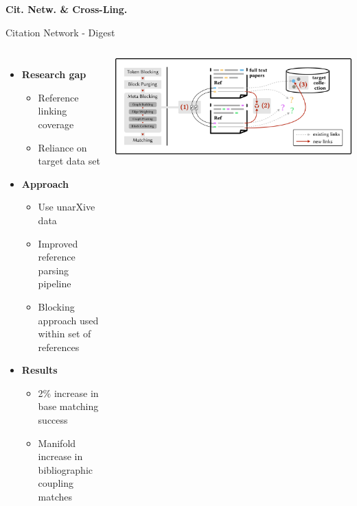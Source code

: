 \documentclass[en,16:9,smallfoot]{sdqbeamer}
\begin{document}
   \begin{frame}[plain]
        \vspace{0.7cm}
        \begin{infobox-map}
        \centering
        \begin{Huge}
        \textbf{Cit. Netw. \& Cross-Ling.}\\
        \end{Huge}
        \end{infobox-map}
   \end{frame}

   \begin{frame}{Citation Network - Digest}

   \begin{columns}
        \begin{itemize}
            \item \textbf{Research gap}
            \begin{itemize}
                \item Reference linking coverage
                \item Reliance on target data set
            \end{itemize}
            \item \textbf{Approach}
            \begin{itemize}
                \item Use unarXive data
                \item Improved reference parsing pipeline
                \item Blocking approach used within set of references
            \end{itemize}
            \item \textbf{Results}
            \begin{itemize}
                \item 2\% increase in base matching success
                \item Manifold increase in bibliographic coupling matches
            \end{itemize}
        \end{itemize}
            \includegraphics[width=\linewidth]{imgs/blocking_schema}

\end{columns}
\end{frame}
\end{document}
